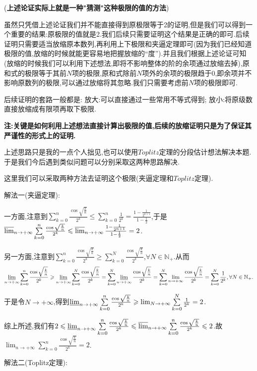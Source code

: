 \documentclass[lang=cn,newtx,10pt,scheme=chinese]{elegantbook}
\begin{document}
\begin{note}
 (\textbf{上述论证实际上就是一种"猜测"这种极限的值的方法})
 
 虽然只凭借上述论证我们并不能直接得到原极限等于2的证明,但是我们可以得到一个重要的结果:原极限的值就是2.我们后续只需要证明这个结果是正确的即可.后续证明只需要适当放缩原本数列,再利用上下极限和夹逼定理即可(因为我们已经知道极限的值,放缩的时候就能更容易地把握放缩的“度”).并且我们根据上述论证可知(放缩的时候我们可以利用下述想法,即将不影响整体的阶的余项通过放缩去掉),原和式的极限等于其前$N$项的极限,原和式除前$N$项外的余项的极限趋于0,即余项并不影响原数列的极限,可以通过放缩将其忽略.我们只需要考虑前$N$项的极限即可.

 后续证明的套路一般都是:
 放大:可以直接通过一些常用不等式得到;
 放小:将原级数直接放缩成有限项再取下极限.

 \textbf{注:关键是如何利用上述想法直接计算出极限的值,后续的放缩证明只是为了保证其严谨性的形式上的证明.}
 \end{note}
 \begin{remark}
   上述思路只是我的一点个人拙见,也可以使用$Toplitz$定理的分段估计想法解决本题.于是我们今后遇到类似问题可以分别采取这两种思路解决.
   
   这里我们可以采取两种方法去证明这个极限(夹逼定理和$Toplitz$定理).
 \end{remark}
 \begin{solution}
   {\color{blue}解法一(夹逼定理):}
 
   一方面,注意到\(\sum\limits_{k = 0}^{n}\frac{\cos\sqrt{\frac{k}{n}}}{2^k} \leqslant \sum\limits_{k = 0}^{n}\frac{1}{2^k} = \frac{1 - \frac{1}{2^{n + 1}}}{1 - \frac{1}{2}}\),于是
     $\varlimsup_{n \to +\infty}\sum\limits_{k = 0}^{n}\frac{\cos\sqrt{\frac{k}{n}}}{2^k} \leqslant \varlimsup_{n \to +\infty}\frac{1 - \frac{1}{2^{n + 1}}}{1 - \frac{1}{2}} = 2$.
  
 另一方面,注意到\(\sum\limits_{k = 0}^{n}\frac{\cos\sqrt{\frac{k}{n}}}{2^k} \geqslant \sum\limits_{k = 0}^{N}\frac{\cos\sqrt{\frac{k}{n}}}{2^k}\),\(\forall N \in \mathbb{N}_+\).从而
 \begin{align*}
   \varliminf_{n \to +\infty}\sum\limits_{k = 0}^{n}\frac{\cos\sqrt{\frac{k}{n}}}{2^k} \geqslant \varliminf_{n \to +\infty}\sum\limits_{k = 0}^{N}\frac{\cos\sqrt{\frac{k}{n}}}{2^k} = \sum\limits_{k = 0}^{N}\varliminf_{n \to +\infty}\frac{\cos\sqrt{\frac{k}{n}}}{2^k} = \sum\limits_{k = 0}^{N}\lim_{n \to +\infty}\frac{\cos\sqrt{\frac{k}{n}}}{2^k} = \sum\limits_{k = 0}^{N}\frac{1}{2^k},\forall N \in \mathbb{N}_+.
 \end{align*}
 
 于是令\(N \to +\infty\),得到\(\varliminf_{n \to +\infty}\sum\limits_{k = 0}^{n}\frac{\cos\sqrt{\frac{k}{n}}}{2^k} \geqslant \lim_{N \to +\infty}\sum\limits_{k = 0}^{N}\frac{1}{2^k} = 2\).
 
 综上所述,我们有\(2 \leqslant \varliminf_{n \to +\infty}\sum\limits_{k = 0}^{n}\frac{\cos\sqrt{\frac{k}{n}}}{2^k} \leqslant \varlimsup_{n \to +\infty}\sum\limits_{k = 0}^{n}\frac{\cos\sqrt{\frac{k}{n}}}{2^k} \leqslant 2\).故\(\lim_{n \to +\infty}\sum\limits_{k = 0}^{n}\frac{\cos\sqrt{\frac{k}{n}}}{2^k} = 2\). 
 
   {\color{blue}解法二(Toplitz定理):}
 \end{solution}
\end{document}
